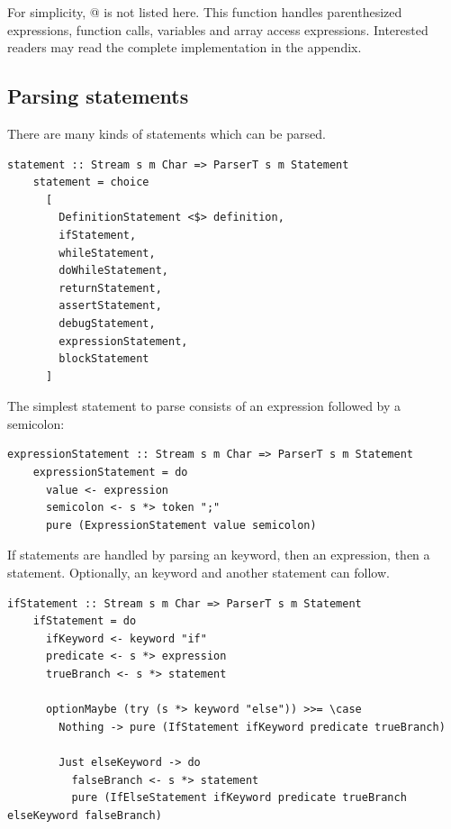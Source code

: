 \documentclass[UdineBachThesis,american,11pt]{PhdThesis}
\begin{document}
  For simplicity, @ is not listed here. This function
  handles parenthesized expressions, function calls, variables and array access
  expressions. Interested readers may read the complete implementation in the
  appendix.

  \subsection{Parsing statements}

  There are many kinds of statements which can be parsed.

  \begin{lstlisting}[gobble=4,basicstyle=\ttfamily\small]
    statement :: Stream s m Char => ParserT s m Statement
    statement = choice
      [
        DefinitionStatement <$> definition,
        ifStatement,
        whileStatement,
        doWhileStatement,
        returnStatement,
        assertStatement,
        debugStatement,
        expressionStatement,
        blockStatement
      ]
  \end{lstlisting}

  The simplest statement to parse consists of an expression followed by a
  semicolon:

  \begin{lstlisting}[gobble=4,basicstyle=\ttfamily\small]
    expressionStatement :: Stream s m Char => ParserT s m Statement
    expressionStatement = do
      value <- expression
      semicolon <- s *> token ";"
      pure (ExpressionStatement value semicolon)
  \end{lstlisting}

  If statements are handled by parsing an \lstinline@if@ keyword, then an
  expression, then a statement. Optionally, an \lstinline@else@ keyword and
  another statement can follow.

  \begin{lstlisting}[gobble=4,basicstyle=\ttfamily\small]
    ifStatement :: Stream s m Char => ParserT s m Statement
    ifStatement = do
      ifKeyword <- keyword "if"
      predicate <- s *> expression
      trueBranch <- s *> statement

      optionMaybe (try (s *> keyword "else")) >>= \case
        Nothing -> pure (IfStatement ifKeyword predicate trueBranch)

        Just elseKeyword -> do
          falseBranch <- s *> statement
          pure (IfElseStatement ifKeyword predicate trueBranch elseKeyword falseBranch)
  \end{lstlisting}
\end{document}
